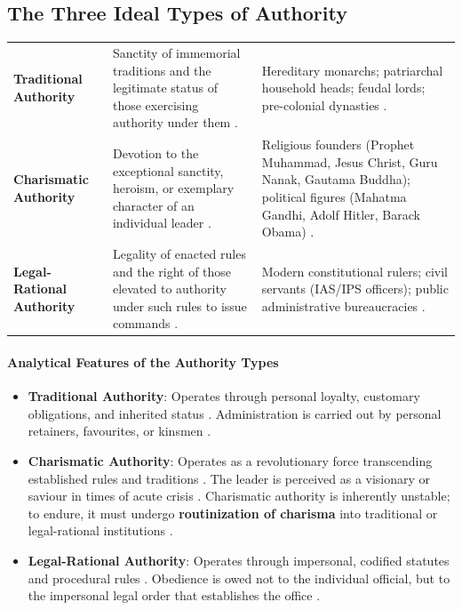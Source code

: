 \subsection{The Three Ideal Types of Authority}

\begin{table}[htbp]
\centering
\begin{tabularx}{\textwidth}{p{3.8cm} Y Y}
\hline
{}
 &  &  \\
\hline
\textbf{Traditional Authority} & Sanctity of immemorial traditions and the legitimate status of those exercising authority under them . & Hereditary monarchs; patriarchal household heads; feudal lords; pre-colonial dynasties . \\
\textbf{Charismatic Authority} & Devotion to the exceptional sanctity, heroism, or exemplary character of an individual leader . & Religious founders (Prophet Muhammad, Jesus Christ, Guru Nanak, Gautama Buddha); political figures (Mahatma Gandhi, Adolf Hitler, Barack Obama) . \\
\textbf{Legal-Rational Authority} & Legality of enacted rules and the right of those elevated to authority under such rules to issue commands . & Modern constitutional rulers; civil servants (IAS/IPS officers); public administrative bureaucracies . \\
\hline
\end{tabularx}
\end{table}

\paragraph{Analytical Features of the Authority Types}
\begin{itemize}
    \item \textbf{Traditional Authority}: Operates through personal loyalty, customary obligations, and inherited status . Administration is carried out by personal retainers, favourites, or kinsmen .
    \item \textbf{Charismatic Authority}: Operates as a revolutionary force transcending established rules and traditions . The leader is perceived as a visionary or saviour in times of acute crisis . Charismatic authority is inherently unstable; to endure, it must undergo \textbf{routinization of charisma} into traditional or legal-rational institutions .
    \item \textbf{Legal-Rational Authority}: Operates through impersonal, codified statutes and procedural rules . Obedience is owed not to the individual official, but to the impersonal legal order that establishes the office .
\end{itemize}

